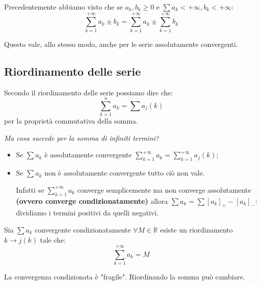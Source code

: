 \begin{osservation*}
    Precedentemente abbiamo visto che se $a_k, b_k\geq0$ e $\sum a_k<+\infty, b_k<+\infty$:
    \begin{equation*}
        \sum^{+\infty}_{k=1}a_k\pm b_k=\sum^{+\infty}_{k=1}a_k\pm \sum^{+\infty}_{k=1}b_k
    \end{equation*}
    
    Questo vale, allo stesso modo, anche per le serie assolutamente convergenti.
\end{osservation*}

\subsection*{Riordinamento delle serie}
Secondo il riordinamento delle serie possiamo dire che:
\begin{equation*}
    \sum^{n}_{k=1}a_k=\sum a_j(k)
\end{equation*}
per la proprietà commutativa della somma.

\textit{Ma cosa succede per la somma di infiniti termini?}
\begin{itemize}
    \item Se $\sum a_k$ è assolutamente convergente $\sum^{+\infty}_{k=1}a_k=\sum^{+\infty}_{k=1}a_j(k)$;
    \item Se $\sum a_k$ non è assolutamente convergente tutto ciò non vale.
    
    Infatti se $\sum^{+\infty}_{k=1}a_k$ converge semplicemente ma non converge assolutamente \textbf{(ovvero converge condizionatamente)} allora $\sum a_k=\sum [a_k]_+-[a_k]_-$: dividiamo i termini positivi da quelli negativi.
\end{itemize}

\begin{thm}
    Sia $\sum a_k$ convergente condizionatamente $\forall M\in\mathbb{R}$ esiste un riordinamento $k\to j(k)$ tale che:
    \begin{equation*}
        \sum^{+\infty}_{k=1}a_k=M
    \end{equation*}
    
    La convergenza condizionata è "fragile". Riordinando la somma può cambiare.
\end{thm}

